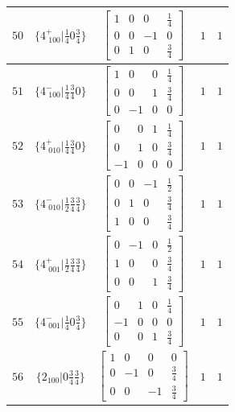 \documentclass[fleqn,8pt]{jsarticle}
\begin{document}
\begin{longtable}{ccccc}
$ 50 $ & $ \{4^{+}_{\,\,100}|\frac{1}{4} 0 \frac{3}{4}\} $ & $ \begin{bmatrix} 1 & 0 & 0 & \frac{1}{4} \\ 0 & 0 & -1 & 0 \\ 0 & 1 & 0 & \frac{3}{4} \end{bmatrix} $ & $ 1 $ & $ 1 $ \\ \hline
$ 51 $ & $ \{4^{-}_{\,\,100}|\frac{1}{4} \frac{3}{4} 0\} $ & $ \begin{bmatrix} 1 & 0 & 0 & \frac{1}{4} \\ 0 & 0 & 1 & \frac{3}{4} \\ 0 & -1 & 0 & 0 \end{bmatrix} $ & $ 1 $ & $ 1 $ \\ \hline
$ 52 $ & $ \{4^{+}_{\,\,010}|\frac{1}{4} \frac{3}{4} 0\} $ & $ \begin{bmatrix} 0 & 0 & 1 & \frac{1}{4} \\ 0 & 1 & 0 & \frac{3}{4} \\ -1 & 0 & 0 & 0 \end{bmatrix} $ & $ 1 $ & $ 1 $ \\ \hline
$ 53 $ & $ \{4^{-}_{\,\,010}|\frac{1}{2} \frac{3}{4} \frac{3}{4}\} $ & $ \begin{bmatrix} 0 & 0 & -1 & \frac{1}{2} \\ 0 & 1 & 0 & \frac{3}{4} \\ 1 & 0 & 0 & \frac{3}{4} \end{bmatrix} $ & $ 1 $ & $ 1 $ \\ \hline
$ 54 $ & $ \{4^{+}_{\,\,001}|\frac{1}{2} \frac{3}{4} \frac{3}{4}\} $ & $ \begin{bmatrix} 0 & -1 & 0 & \frac{1}{2} \\ 1 & 0 & 0 & \frac{3}{4} \\ 0 & 0 & 1 & \frac{3}{4} \end{bmatrix} $ & $ 1 $ & $ 1 $ \\ \hline
$ 55 $ & $ \{4^{-}_{\,\,001}|\frac{1}{4} 0 \frac{3}{4}\} $ & $ \begin{bmatrix} 0 & 1 & 0 & \frac{1}{4} \\ -1 & 0 & 0 & 0 \\ 0 & 0 & 1 & \frac{3}{4} \end{bmatrix} $ & $ 1 $ & $ 1 $ \\ \hline
$ 56 $ & $ \{2{}_{100}|0 \frac{3}{4} \frac{3}{4}\} $ & $ \begin{bmatrix} 1 & 0 & 0 & 0 \\ 0 & -1 & 0 & \frac{3}{4} \\ 0 & 0 & -1 & \frac{3}{4} \end{bmatrix} $ & $ 1 $ & $ 1 $ \\ \hline

\end{longtable}
\end{document}
